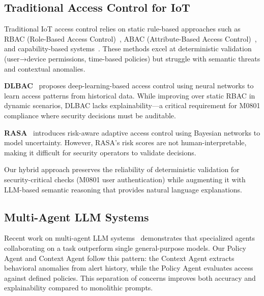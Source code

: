 \subsection{Traditional Access Control for IoT}

Traditional IoT access control relies on static rule-based approaches such as RBAC (Role-Based Access Control)~\cite{rbac2004}, ABAC (Attribute-Based Access Control)~\cite{abac2012}, and capability-based systems~\cite{capability2016}. These methods excel at deterministic validation (user→device permissions, time-based policies) but struggle with semantic threats and contextual anomalies.

\textbf{DLBAC}~\cite{dlbac2022} proposes deep-learning-based access control using neural networks to learn access patterns from historical data. While improving over static RBAC in dynamic scenarios, DLBAC lacks explainability—a critical requirement for M0801 compliance where security decisions must be auditable.

\textbf{RASA}~\cite{rasa2021} introduces risk-aware adaptive access control using Bayesian networks to model uncertainty. However, RASA's risk scores are not human-interpretable, making it difficult for security operators to validate decisions.

Our hybrid approach preserves the reliability of deterministic validation for security-critical checks (M0801 user authentication) while augmenting it with LLM-based semantic reasoning that provides natural language explanations.

\subsection{Multi-Agent LLM Systems}

Recent work on multi-agent LLM systems~\cite{multiagent2023} demonstrates that specialized agents collaborating on a task outperform single general-purpose models. Our Policy Agent and Context Agent follow this pattern: the Context Agent extracts behavioral anomalies from alert history, while the Policy Agent evaluates access against defined policies. This separation of concerns improves both accuracy and explainability compared to monolithic prompts.
